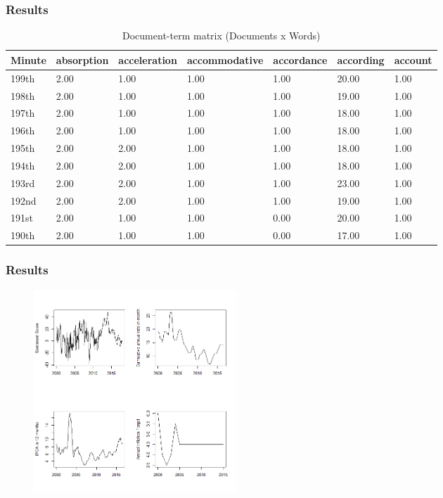 \documentclass[aspectratio=169]{beamer}
\begin{document}
\begin{frame}\frametitle{Results}
  \begin{table}[h!]
  \centering
  \caption{Document-term matrix (Documents x Words)}
  \begin{tabular}{@{}lllllll@{}}
  \toprule
  Minute & absorption & acceleration & accommodative & accordance & according & account \\ 
  \midrule
  199th & 2.00 & 1.00 & 1.00 & 1.00 & 20.00 & 1.00 \\ 
  198th & 2.00 & 1.00 & 1.00 & 1.00 & 19.00 & 1.00 \\ 
  197th & 2.00 & 1.00 & 1.00 & 1.00 & 18.00 & 1.00 \\ 
  196th & 2.00 & 1.00 & 1.00 & 1.00 & 18.00 & 1.00 \\ 
  195th & 2.00 & 2.00 & 1.00 & 1.00 & 18.00 & 1.00 \\ 
  194th & 2.00 & 2.00 & 1.00 & 1.00 & 18.00 & 1.00 \\ 
  193rd & 2.00 & 2.00 & 1.00 & 1.00 & 23.00 & 1.00 \\ 
  192nd & 2.00 & 2.00 & 1.00 & 1.00 & 19.00 & 1.00 \\ 
  191st & 2.00 & 1.00 & 1.00 & 0.00 & 20.00 & 1.00 \\ 
  190th & 2.00 & 1.00 & 1.00 & 0.00 & 17.00 & 1.00 \\ 
  \bottomrule
  \end{tabular}
  \end{table}
\end{frame}

\begin{frame}\frametitle{Results}
  \begin{figure}[hb]
  \includegraphics[width=3in]{comparative_en.png}
  \end{figure}
\end{frame}
\end{document}
